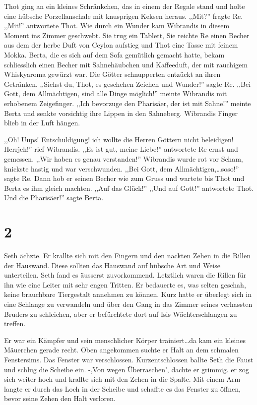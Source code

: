 Thot ging an ein kleines Schränkchen, das in einem der Regale stand und holte eine hübsche Porzellanschale mit knusprigen Keksen heraus. ,,Mit?'' fragte Re. ,,Mit!'' antwortete Thot. Wie durch ein Wunder kam Wibrandis in diesem Moment ins Zimmer geschwebt. Sie trug ein Tablett, Sie reichte Re einen Becher aus dem der herbe Duft von Ceylon aufstieg und Thot eine Tasse mit feinem Mokka. Berta, die es sich auf dem Sofa gemütlich gemacht hatte, bekam schliesslich einen Becher mit Sahnehäubchen und Kaffeeduft, der mit rauchigem Whiskyaroma gewürzt war. Die Götter schnupperten entzückt an ihren Getränken. ,,Siehst du, Thot, es geschehen Zeichen und Wunder!'' sagte Re. ,,Bei Gott, dem Allmächtigen, sind alle Dinge möglich!'' meinte Wibrandis mit erhobenem Zeigefinger. ,,Ich bevorzuge den Pharisäer, der ist mit Sahne!'' meinte Berta und senkte vorsichtig ihre Lippen in den Sahneberg. Wibrandis Finger blieb in der Luft hängen.

,,Oh! Uups! Entschuldigung! ich wollte die Herren Göttern nicht beleidigen! Herrjeh!'' rief Wibrandis. ,,Es ist gut, meine Liebe!'' antwortete Re ernst und gemessen. ,,Wir haben es genau verstanden!'' Wibrandis wurde rot vor Scham, knickste hastig und war verschwunden. ,,Bei Gott, dem Allmächtigen,\dots soso!'' sagte Re. Dann hob er seinen Becher wie zum Gruss und wartete bis Thot und Berta es ihm gleich machten. ,,Auf das Glück!'' ,,Und auf Gott!'' antwortete Thot. Und die Pharisäer!'' sagte Berta.

\section*{2}

Seth ächzte. Er krallte sich mit den Fingern und den nackten Zehen in die Rillen der Hauswand. Diese sollten das Hauswand auf hübsche Art und Weise unterteilen. Seth fand es äusserst zuvorkommend. Letztlich waren die Rillen für ihn wie eine Leiter mit sehr engen Tritten. Er bedauerte es, was selten geschah, keine brauchbare Tiergestalt annehmen zu können. Kurz hatte er überlegt sich in eine Schlange zu verwandeln und über den Gang in das Zimmer seines verhassten Bruders zu schleichen, aber er befürchtete dort auf Isis Wächterschlangen zu treffen.

Er war ein Kämpfer und sein menschlicher Körper trainiert\dots da kam ein kleines Mäuerchen gerade recht. Oben angekommen suchte er Halt an dem schmalen Fenstersims. Das Fenster war verschlossen. Kurzentschlossen ballte Seth die Faust und schlug die Scheibe ein. -,Von wegen Überraschen', dachte er grimmig. er zog sich weiter hoch und krallte sich mit den Zehen in die Spalte. Mit einem Arm langte er durch das Loch in der Scheibe und schaffte es das Fenster zu öffnen, bevor seine Zehen den Halt verloren.

